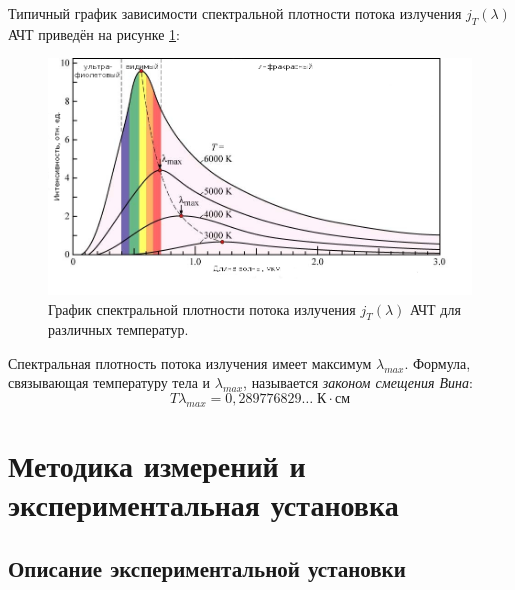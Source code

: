 \documentclass[a4paper, 12pt]{article}
\begin{document}
    Типичный график зависимости спектральной плотности потока излучения $j_T(\lambda)$ АЧТ приведён на рисунке \ref{img:j_T(lambda)}:
    
    \begin{figure}[H]
        \centering
        \includegraphics[width=1\textwidth]{images/j_t(lambda).jpg}
        \caption{График спектральной плотности потока излучения $j_T(\lambda)$ АЧТ для различных температур.}
        \label{img:j_T(lambda)}
    \end{figure}
    
    Спектральная плотность потока излучения имеет максимум $\lambda_{max}$. Формула, связывающая температуру тела и $\lambda_{max}$, называется \textit{законом смещения Вина}:
    $$
    T \lambda_{max} = 0,289776829 \dots \; К \cdot см
    $$

    \newpage
    
    \section{Методика измерений и экспериментальная установка}

    \subsection{Описание экспериментальной установки}
\end{document}
